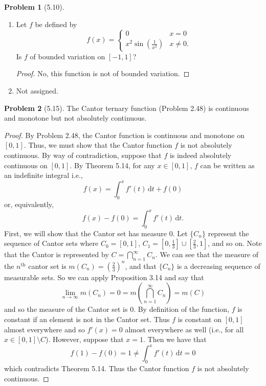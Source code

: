 \documentclass[12pt]{article}
\newcommand{\dif}{\, \mathrm{d}}
\theoremstyle{definition}
\newtheorem{problem}{Problem}
\begin{document}
\begin{problem}[5.10]

  \begin{enumerate}[label = (\alph{*})]
    \item  Let \( f \) be defined  by
      \[
          f(x) = \begin{cases}
            0 & x = 0 \\
            x^2 \sin \left( \frac{1}{x^2} \right) & x \neq 0.
          \end{cases}
      \]
      Is \( f \) of bounded variation on \( [-1,1] \)?

          \begin{proof}
            No, this function is not of bounded variation. 
          \end{proof}
    \item  Not assigned. 
  \end{enumerate}

    
\end{problem}

\begin{problem}[5.15]

  The Cantor ternary function (Problem 2.48) is continuous and monotone but not absolutely continuous. 
    \begin{proof}
      By Problem 2.48, the Cantor function is continuous and monotone on \( [0,1] \).
      Thus, we must show that the Cantor function \( f \) is not absolutely continuous. 
      By way of contradiction, suppose that \( f \) is indeed absolutely continuous on \( [0,1] \).
      By Theorem 5.14, for any \( x \in [0,1] \), \( f \) can be written as an indefinite integral i.e.,
        \[
            f(x) = \int_{0}^{x} f'(t) \dif t + f(0)
        \]
      or, equivalently,
        \[
          f(x) - f(0) = \int_{0}^{x} f'(t) \dif t.
        \]
      First, we will show that the Cantor set has measure \( 0 \). 
      Let \( \{C_n\} \) represent the sequence of Cantor sets where \( \displaystyle C_0 = [0,1] \), \( \displaystyle C_1 = \left[ 0, \frac{1}{3} \right] \cup \left[ \frac{2}{3}, 1 \right] \), and so on. 
      Note that the Cantor is represented by \( \displaystyle C = \bigcap_{n=1}^{\infty} C_n \).
      We can see that the measure of the \( n^{\text{th}} \) cantor set is \( \displaystyle m \left(C_n\right) = \left( \frac{2}{3} \right)^{n} \), and that \( \{C_n\} \) is a decreasing sequence of measurable sets.
       So we can apply Proposition 3.14 and say that 
        \[
              \lim_{n \to \infty} m(C_n) = 0 = m \left( \bigcap_{n=1}^{\infty} C_n \right) = m(C)
        \]
      and so the measure of the Cantor set is \( 0 \). By definition of the function, \( f \) is constant if an element is not in the Cantor set. 
      Thus \( f \) is constant on \( [0,1] \) almost everywhere and so \( f'(x) = 0 \) almost everywhere as well (i.e., for all \( x \in [0,1] \setminus C \)). However, suppose that \( x = 1 \). Then we have that 
        \[
          f(1) - f(0) = 1 \neq \int_{0}^{x} f'(t) \dif t = 0
        \]        
      which contradicts Theorem 5.14. Thus the Cantor function \( f \) is not absolutely continuous. 
    \end{proof}
\end{problem}
\end{document}
